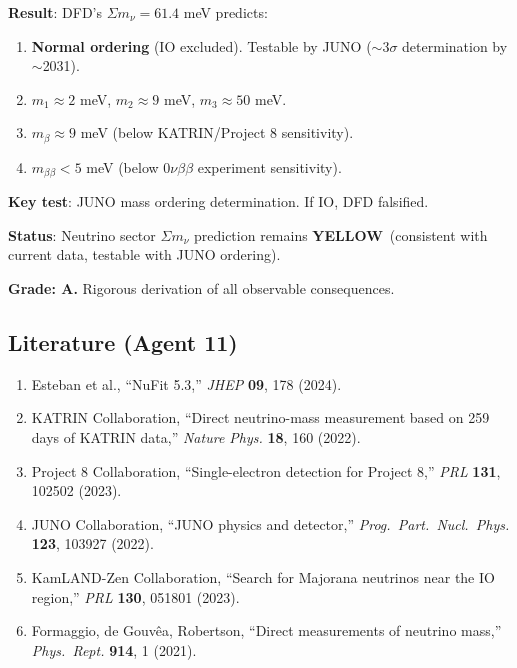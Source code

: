 \documentclass[11pt,a4paper]{article}
\newcommand{\YELLOW}{\textcolor{dfdyellow}{\textbf{YELLOW}}}
\begin{document}
\begin{tcolorbox}[colback=blue!5!white, colframe=blue!60!black, title={Agent 11: Neutrino Oscillation Constraints}]
\textbf{Result}: DFD's $\Sigma m_\nu = 61.4$ meV predicts:
\begin{enumerate}
\item \textbf{Normal ordering} (IO excluded). Testable by JUNO ($\sim 3\sigma$ determination by $\sim$2031).
\item $m_1 \approx 2$ meV, $m_2 \approx 9$ meV, $m_3 \approx 50$ meV.
\item $m_\beta \approx 9$ meV (below KATRIN/Project 8 sensitivity).
\item $m_{\beta\beta} < 5$ meV (below $0\nu\beta\beta$ experiment sensitivity).
\end{enumerate}

\textbf{Key test}: JUNO mass ordering determination. If IO, DFD falsified.

\textbf{Status}: Neutrino sector $\Sigma m_\nu$ prediction remains \YELLOW\ (consistent with current data, testable with JUNO ordering).

\textbf{Grade: A.} Rigorous derivation of all observable consequences.
\end{tcolorbox}

\subsection{Literature (Agent 11)}

\begin{enumerate}
\item Esteban et al., ``NuFit 5.3,'' \textit{JHEP} \textbf{09}, 178 (2024).
\item KATRIN Collaboration, ``Direct neutrino-mass measurement based on 259 days of KATRIN data,'' \textit{Nature Phys.} \textbf{18}, 160 (2022).
\item Project 8 Collaboration, ``Single-electron detection for Project 8,'' \textit{PRL} \textbf{131}, 102502 (2023).
\item JUNO Collaboration, ``JUNO physics and detector,'' \textit{Prog.\ Part.\ Nucl.\ Phys.} \textbf{123}, 103927 (2022).
\item KamLAND-Zen Collaboration, ``Search for Majorana neutrinos near the IO region,'' \textit{PRL} \textbf{130}, 051801 (2023).
\item Formaggio, de Gouv\^ea, Robertson, ``Direct measurements of neutrino mass,'' \textit{Phys.\ Rept.} \textbf{914}, 1 (2021).
\end{enumerate}
\end{document}
